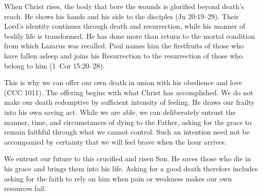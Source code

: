 When Christ rises, the body that bore the wounds is glorified beyond death's reach. He shows his hands and his side to the disciples (Jn 20:19--29). Their Lord's identity continues through death and resurrection, while his manner of bodily life is transformed. He has done more than return to the mortal condition from which Lazarus was recalled. Paul names him the firstfruits of those who have fallen asleep and joins his Resurrection to the resurrection of those who belong to him (1~Cor 15:20--28).

This is why we can offer our own death in union with his obedience and love (CCC 1011). The offering begins with what Christ has accomplished. We do not make our death redemptive by sufficient intensity of feeling. He draws our frailty into his own saving act. While we are able, we can deliberately entrust the manner, time, and circumstances of dying to the Father, asking for the grace to remain faithful through what we cannot control. Such an intention need not be accompanied by certainty that we will feel brave when the hour arrives.

We entrust our future to this crucified and risen Son. He saves those who die in his grace and brings them into his life. Asking for a good death therefore includes asking for the faith to rely on him when pain or weakness makes our own resources fail.

